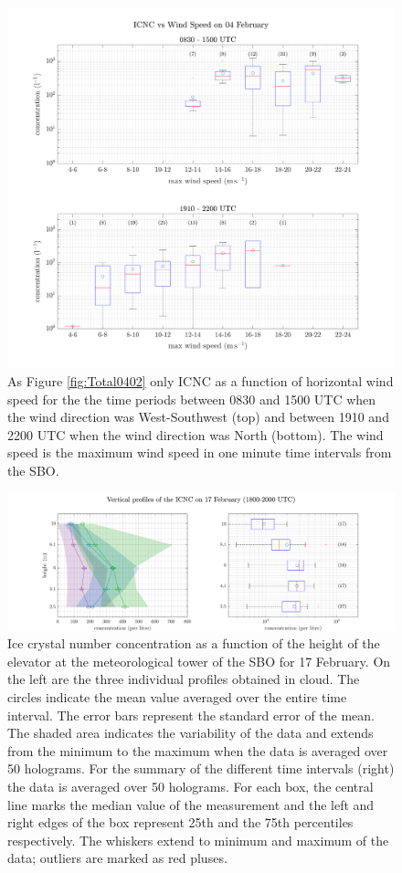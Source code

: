 \documentclass[draft,linenumbers]{agujournal}
\begin{document}
\begin{figure}[t]
 \centering
 	\includegraphics[width=14cm]{0402_OverviewWS.png}
 \caption{As Figure \ref{fig:Total0402} only ICNC as a function of horizontal wind speed for the the time periods between 0830 and 1500 UTC when the wind direction was West-Southwest (top) and between 1910 and 2200 UTC when the wind direction was North (bottom). The wind speed is the maximum wind speed in one minute time intervals from the SBO.}
 \label{fig:ICNCvsWSMAX0402}
\end{figure}

\begin{figure}[t]
 \centering
 	\includegraphics[width=14cm]{1702_Overview.png}
 \caption{Ice crystal number concentration as a function of the height of the elevator at the meteorological tower of the SBO for 17 February. On the left are the three individual profiles obtained in cloud. The circles indicate the mean value averaged over the entire time interval. The error bars represent the standard error of the mean. The shaded area indicates the variability of the data and extends from the minimum to the maximum when the data is averaged over 50 holograms. For the summary of the different time intervals (right) the data is averaged over 50 holograms. For each box, the central line marks the median value of the measurement and the left and right edges of the box represent 25th and the 75th percentiles respectively. The whiskers extend to minimum and maximum of the data; outliers are marked as red pluses.}
 \label{fig:profiles1702}
\end{figure}
\end{document}
